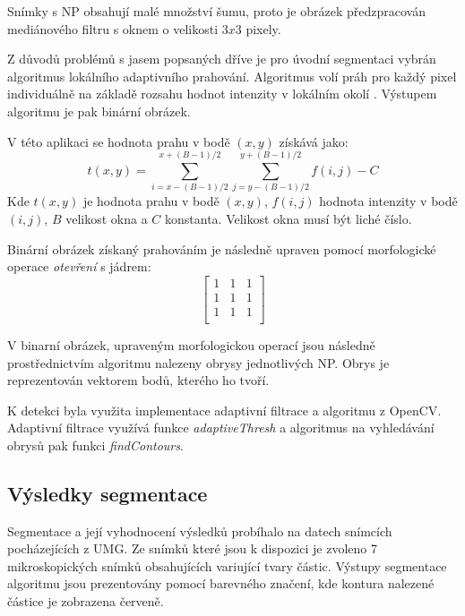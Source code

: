 \documentclass[11pt,twoside,a4paper,table]{book}
\begin{document}
Snímky s NP obsahují malé množství šumu, proto je obrázek předzpracován mediánového filtru s oknem o velikosti $3x3$ pixely. 

Z důvodů problémů s jasem popsaných dříve je pro úvodní segmentaci vybrán algoritmus lokálního adaptivního prahování. Algoritmus volí práh pro každý pixel individuálně na základě rozsahu hodnot intenzity v lokálním okolí \cite{on:adaptive}. Výstupem algoritmu je pak binární obrázek.

V této aplikaci se hodnota prahu v bodě $(x,y)$ získává jako:
\begin{equation}
t(x,y) = \sum_{i=x-(B-1)/2}^{x+(B-1)/2} \sum_{j=y-(B-1)/2}^{y+(B-1)/2}f(i,j) - C
\end{equation}
Kde $t(x,y)$ je hodnota prahu v bodě $(x,y)$, $f(i,j)$ hodnota intenzity v bodě $(i,j)$, $B$ velikost okna a $C$ konstanta. Velikost okna musí být liché číslo.

Binární obrázek získaný prahováním je následně upraven pomocí morfologické operace \textit{otevření} s jádrem:
\begin{equation}
\begin{bmatrix}
1 & 1 & 1 \\
1 & 1 & 1 \\
1 & 1 & 1 \\
\end{bmatrix}
\end{equation}

V binarní obrázek, upraveným morfologickou operací jsou následně prostřednictvím algoritmu \cite{suzuki85} nalezeny obrysy jednotlivých NP. Obrys je reprezentován vektorem bodů, kterého ho tvoří.

K detekci byla využita implementace adaptivní filtrace a algoritmu \cite{suzuki85} z OpenCV\cite{opencv}. Adaptivní filtrace využívá funkce \textit{adaptiveThresh} a algoritmus na vyhledávání obrysů pak funkci \textit{findContours}.

\subsection{Výsledky segmentace}
Segmentace a její vyhodnocení výsledků probíhalo na datech snímcích pocházejících z UMG. Ze snímků které jsou k dispozici je zvoleno 7 mikroskopických snímků obsahujících variující tvary částic. Výstupy segmentace algoritmu jsou prezentovány pomocí barevného značení, kde kontura nalezené částice je zobrazena červeně.
\end{document}

